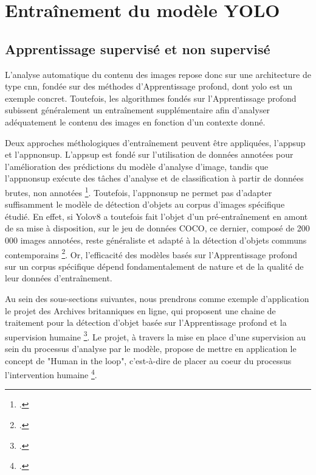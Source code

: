 \section{\label{II_2_B}Entraînement du modèle YOLO}

\subsection{Apprentissage supervisé et non supervisé}
L'analyse automatique du contenu des images repose donc sur une architecture de type \gls{cnn}, fondée sur des méthodes d'\gls{Apprentissage profond}, dont \gls{yolo} est un exemple concret. Toutefois, les algorithmes fondés sur l'\gls{Apprentissage profond} subissent généralement un entraînement supplémentaire afin d'analyser adéquatement le contenu des images en fonction d'un contexte donné.

Deux approches méthologiques d'entraînement peuvent être appliquées, l'\gls{appsup} et l'\gls{appnonsup}. L'\gls{appsup} est fondé sur l'utilisation de données annotées pour l'amélioration des prédictions du modèle d'analyse d'image, tandis que l'\gls{appnonsup} exécute des tâches d'analyse et de classification à partir de données brutes, non annotées \footcite{delua2024}. Toutefois, l'\gls{appnonsup} ne permet pas d'adapter suffisamment le modèle de détection d'objets au corpus d'images spécifique étudié. En effet, si Yolov8 a toutefois fait l'objet d'un pré-entraînement en amont de sa mise à disposition, sur le jeu de données COCO, ce dernier, composé de 200 000 images annotées, reste généraliste et adapté à la détection d'objets communs contemporains \footcite{2023b}. Or, l'efficacité des modèles basés sur l'\gls{Apprentissage profond} sur un corpus spécifique dépend fondamentalement de nature et de la qualité de leur données d'entraînement. 

Au sein des sous-sections suivantes, nous prendrons comme exemple d’application le projet des Archives britanniques en ligne, qui proposent une chaine de traitement pour la détection d’objet basée sur l'\gls{Apprentissage profond} et la supervision humaine \footcite{kasturi2024}. Le projet, à travers la mise en place d'une supervision au sein du processus d'analyse par le modèle, propose de mettre en application le concept de "Human in the loop", c'est-à-dire de placer au coeur du processus l'intervention humaine \footcite{kasturi2024}.

